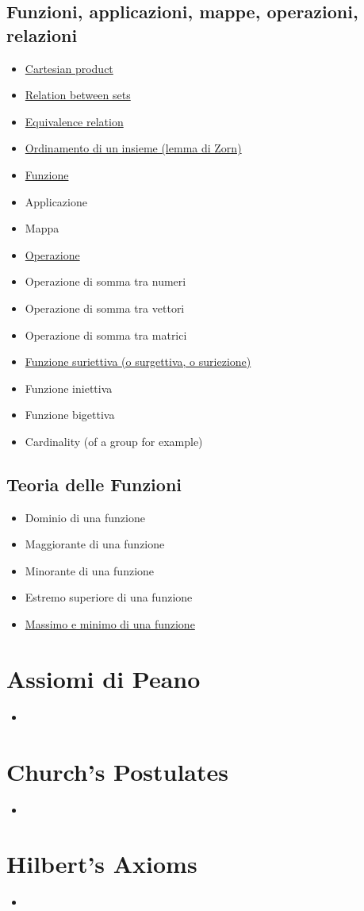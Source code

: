 \documentclass[a4paper,10pt]{article}
\begin{document}
\subsection*{Funzioni, applicazioni, mappe, operazioni, relazioni}
\begin{itemize}
 \item \href{CartesianProduct.html}{Cartesian product}
 \item \href{Relation.html}{Relation between sets}
 \item \href{EquivalenceRelation.html}{Equivalence relation}
 \item \href{OrdinamentoInsieme.html}{Ordinamento di un insieme (lemma di Zorn)}
 \item \href{Function.html}{Funzione}
 \item Applicazione
 \item Mappa
 \item \href{Operazione.html}{Operazione}
 \item Operazione di somma tra numeri
 \item Operazione di somma tra vettori
 \item Operazione di somma tra matrici
 \item \href{./FunzioneSuriettiva.html}{Funzione suriettiva (o surgettiva, o suriezione)}
 \item Funzione iniettiva
 \item Funzione bigettiva
 \item Cardinality (of a group for example)
\end{itemize}

\subsection*{Teoria delle Funzioni}
\begin{itemize}
 \item Dominio di una funzione
 \item Maggiorante di una funzione
 \item Minorante di una funzione
 \item Estremo superiore di una funzione
 \item \href{FunzioneMassimoMinimo.html}{Massimo e minimo di una funzione}
\end{itemize}

\section{Assiomi di Peano}
\begin{itemize}
 \item 
\end{itemize}

\section{Church's Postulates}
\begin{itemize}
 \item 
\end{itemize}

\section{Hilbert's Axioms}
\begin{itemize}
 \item 
\end{itemize}
\end{document}
